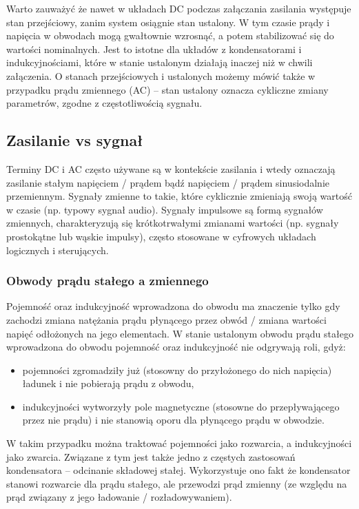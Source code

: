 Warto zauważyć że nawet w układach DC podczas załączania zasilania występuje stan przejściowy, zanim system osiągnie stan ustalony. W tym czasie prądy i napięcia w obwodach mogą gwałtownie wzrosnąć, a potem stabilizować się do wartości nominalnych. Jest to istotne dla układów z kondensatorami i indukcyjnościami, które w stanie ustalonym działają inaczej niż w chwili załączenia. O stanach przejściowych i ustalonych możemy mówić także w przypadku prądu zmiennego (AC) – stan ustalony oznacza cykliczne zmiany parametrów, zgodne z częstotliwością sygnału.

\subsection{Zasilanie vs sygnał}

Terminy DC i AC często używane są w kontekście zasilania i wtedy oznaczają zasilanie stałym napięciem / prądem bądź napięciem / prądem sinusiodalnie przemiennym. Sygnały zmienne to takie, które cyklicznie zmieniają swoją wartość w czasie (np. typowy sygnał audio). Sygnały impulsowe są formą sygnałów zmiennych, charakteryzują się krótkotrwałymi zmianami wartości (np. sygnały prostokątne lub wąskie impulsy), często stosowane w cyfrowych układach logicznych i sterujących.


\subsubsection{Obwody prądu stałego a zmiennego}

Pojemność oraz indukcyjność wprowadzona do obwodu ma znaczenie tylko gdy zachodzi zmiana natężania prądu płynącego przez obwód / zmiana wartości napięć odłożonych na jego elementach. W stanie ustalonym obwodu prądu stałego wprowadzona do obwodu pojemność oraz indukcyjność nie odgrywają roli, gdyż:

\begin{itemize}
	\item pojemności zgromadziły już (stosowny do przyłożonego do nich napięcia) ładunek i nie pobierają prądu z obwodu,
    \item indukcyjności wytworzyły pole magnetyczne (stosowne do przepływającego przez nie prądu) i nie stanowią oporu dla płynącego prądu w obwodzie.
\end{itemize}

W takim przypadku można traktować pojemności jako rozwarcia, a indukcyjności jako zwarcia. Związane z tym jest także jedno z częstych zastosowań kondensatora – odcinanie składowej stałej. Wykorzystuje ono fakt że kondensator stanowi rozwarcie dla prądu stałego, ale przewodzi prąd zmienny (ze względu na prąd związany z jego ładowanie / rozładowywaniem).

